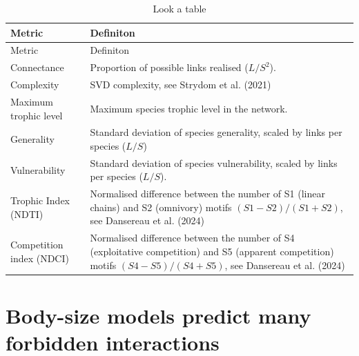 \documentclass[
]{article}
\begin{document}
\begin{longtable}[]{@{}
  >{\raggedright\arraybackslash}p{}
  >{\raggedright\arraybackslash}p{}@{}}
\caption{Look a table}\label{tbl-metrics}\tabularnewline
\toprule\noalign{}
\begin{minipage}[b]{\linewidth}\raggedright
Metric
\end{minipage} & \begin{minipage}[b]{\linewidth}\raggedright
Definiton
\end{minipage} \\
\midrule\noalign{}
\endfirsthead
\toprule\noalign{}
\begin{minipage}[b]{\linewidth}\raggedright
Metric
\end{minipage} & \begin{minipage}[b]{\linewidth}\raggedright
Definiton
\end{minipage} \\
\midrule\noalign{}
\endhead
\bottomrule\noalign{}
\endlastfoot
Connectance & Proportion of possible links realised (\(L/S^2\)). \\
Complexity & SVD complexity, see Strydom et al. (2021) \\
Maximum trophic level & Maximum species trophic level in the network. \\
Generality & Standard deviation of species generality, scaled by links
per species (\(L/S\)) \\
Vulnerability & Standard deviation of species vulnerability, scaled by
links per species (\(L/S\)). \\
Trophic Index (NDTI) & Normalised difference between the number of S1
(linear chains) and S2 (omnivory) motifs \((S1 - S2)/(S1 + S2)\), see
Dansereau et al. (2024) \\
Competition index (NDCI) & Normalised difference between the number of
S4 (exploitative competition) and S5 (apparent competition) motifs
\((S4 - S5)/(S4 + S5)\), see Dansereau et al. (2024) \\
\end{longtable}

\section{Body-size models predict many forbidden
interactions}\label{body-size-models-predict-many-forbidden-interactions}
\end{document}
